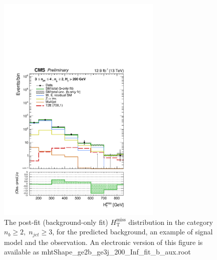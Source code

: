 \begin{figure}[tbhp]
    \caption{ 
    The post-fit (background-only fit) $H_{\mathrm{T}}^{\mathrm{miss}}$ distribution in the category $n_{b}\geq 2, \; n_{jet} \geq 3$, 
    for the predicted background, an example of signal model and the observation.
    An electronic version of this figure is available as mhtShape\_ge2b\_ge3j\_200\_Inf\_fit\_b\_aux.root
    \label{fig:mhtShape_ge2b_ge3j_fit_b} }
  \begin{center}
  \includegraphics[width=0.7\textwidth]{mhtShape_ge2b_ge3j_200_Inf_fit_b_aux}
  \end{center}
\end{figure}


